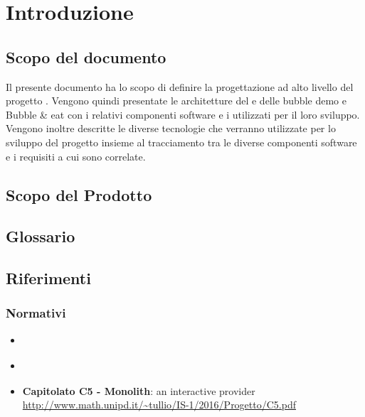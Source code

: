 \section{Introduzione}

\subsection{Scopo del documento}
Il presente documento ha lo scopo di definire la progettazione ad alto livello del progetto \glossario{\ProjectName{}}. Vengono quindi presentate le architetture del  e delle bubble demo  e Bubble \& eat con i relativi componenti software e i  utilizzati per il loro sviluppo. Vengono inoltre descritte le diverse tecnologie che verranno utilizzate per lo sviluppo del progetto insieme al tracciamento tra le diverse componenti software e i requisiti a cui sono correlate.

\subsection{Scopo del Prodotto}
\ScopoDelProdotto

\subsection{Glossario}
\GlossarioIntroduzione

\subsection{Riferimenti}
\subsubsection{Normativi}
\begin{itemize}
	\item \textbf{\NormeDiProgetto}
	\item \textbf{\AnalisiDeiRequisiti}
	\item \textbf{Capitolato C5 - Monolith}: an interactive provider\\
	 \url{http://www.math.unipd.it/~tullio/IS-1/2016/Progetto/C5.pdf}
\end{itemize}
